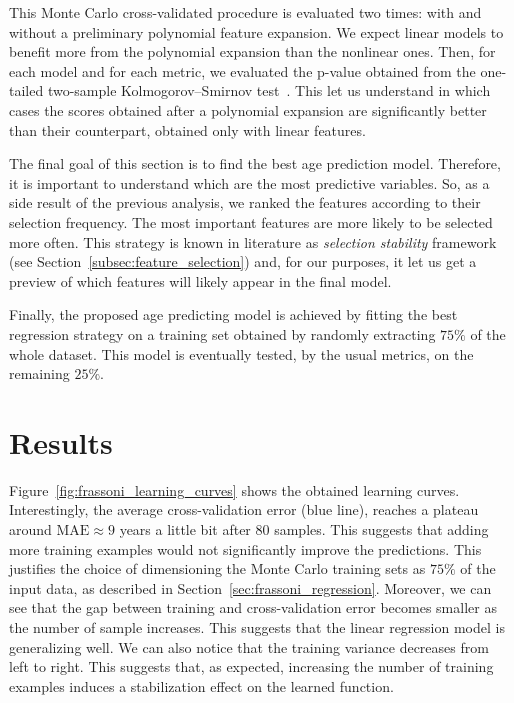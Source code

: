 This Monte Carlo cross-validated procedure is evaluated two times: with and without a preliminary polynomial feature expansion. We expect linear models to benefit more from the polynomial expansion than the nonlinear ones.
Then, for each model and for each metric, we evaluated the p-value obtained from the one-tailed two-sample Kolmogorov–Smirnov test~\cite{everitt2002cambridge}. This let us understand in which cases the scores obtained after a polynomial expansion are significantly better than their counterpart, obtained only with  linear features.

The final goal of this section is to find the best age prediction model. Therefore, it is important to understand which are the most predictive variables.
So, as a side result of the previous analysis, we ranked the features according to their selection frequency. The most important features are more likely to be selected more often. This strategy is known in literature as  \textit{selection stability} framework (see Section~\ref{subsec:feature_selection}) and, for our purposes, it let us get a preview of which features will likely appear in the final model.

Finally, the proposed age predicting model is achieved by fitting the best regression strategy on a training set obtained by randomly extracting $75\%$ of the whole dataset. This model is eventually tested, by the usual metrics, on the remaining $25\%$.

\section{Results} \label{sec:frassoni_results}
Figure~\ref{fig:frassoni_learning_curves} shows the obtained learning curves. Interestingly, the average cross-validation error (blue line), reaches a plateau around $\text{MAE} \approx 9$ years a little bit after $80$ samples. This suggests that adding more training examples would not significantly improve the predictions. This justifies the choice of dimensioning the Monte Carlo training sets as $75\%$ of the input data, as described in Section~\ref{sec:frassoni_regression}.
Moreover, we can see that the gap between training and cross-validation error becomes smaller as the number of sample increases. This suggests that the linear regression model is generalizing well. We can also notice that the training variance decreases from left to right. This suggests that, as expected, increasing the number of training examples induces a stabilization effect on the learned function.


